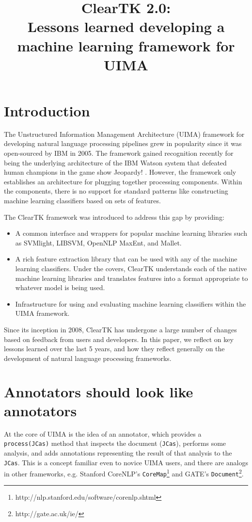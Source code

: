 \documentclass[10pt, a4paper]{article}
\title{ClearTK 2.0:\\ Lessons learned developing a machine learning framework for UIMA}
\newcommand{\code}[1]{\texttt{\small #1}}
\begin{document}
\maketitleabstract

\section{Introduction}
The Unstructured Information Management Architecture (UIMA) framework for developing natural language processing pipelines grew in popularity since it was open-sourced by IBM in 2005.
The framework gained recognition recently for being the underlying architecture of the IBM Watson system that defeated human champions in the game show Jeopardy! \cite{ferrucci_building_2010}.
However, the framework only establishes an architecture for plugging together processing components.
Within the components, there is no support for standard patterns like constructing machine learning classifiers based on sets of features.

The ClearTK framework was introduced to address this gap \cite{ogren-etal:2008:UIMA-LREC,ogren-etal:2009:UIMA-GSCL} by providing:
\begin{itemize}
\item A common interface and wrappers for popular machine learning libraries such as SVMlight, LIBSVM, OpenNLP MaxEnt, and Mallet.
\item A rich feature extraction library that can be used with any of the machine learning classifiers. Under the covers, ClearTK understands each of the native machine learning libraries and translates features into a format appropriate to whatever model is being used.
\item Infrastructure for using and evaluating machine learning classifiers within the UIMA framework.
\end{itemize}

Since its inception in 2008, ClearTK has undergone a large number of changes based on feedback from users and developers.
In this paper, we reflect on key lessons learned over the last 5 years, and how they reflect generally on the development of natural language processing frameworks.

\section{Annotators should look like annotators}
At the core of UIMA is the idea of an annotator, which provides a \code{process(JCas)} method that inspects the document (\code{JCas}), performs some analysis, and adds annotations representing the result of that analysis to the \code{JCas}.
This is a concept familiar even to novice UIMA users, and there are analogs in other frameworks, e.g. Stanford CoreNLP's \code{CoreMap}\footnote{http://nlp.stanford.edu/software/corenlp.shtml} and GATE's \code{Document}\footnote{http://gate.ac.uk/ie/}.
\end{document}

